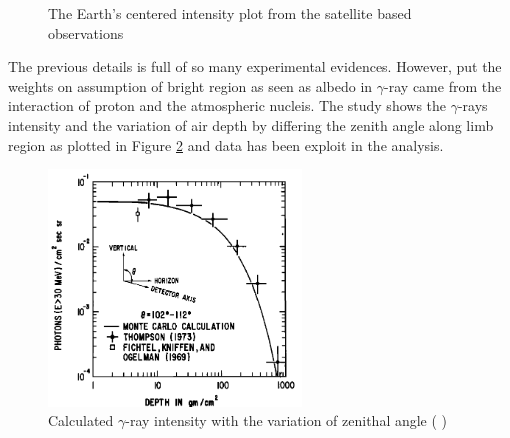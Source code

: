 \begin{figure}[h]
    \centering
        \hfill
        \caption{
            The Earth's centered intensity plot from the satellite based observations
        }
       \label{fig:gamma_earth_second_wave}
\end{figure}

The previous details is full of so many experimental evidences.
However, \cite{Morris84} put the weights on assumption of 
bright region as seen as albedo in $\gamma$-ray came from the 
interaction of proton and the atmospheric nucleis. The study
shows the $\gamma$-rays intensity and the variation of air depth 
by differing the zenith angle along limb region as plotted in 
Figure \ref{fig:emit_photon_vs_depth} and \cite{Thompson81} data 
has been exploit in the analysis.

\begin{figure}[h]
    \centering
    \includegraphics[width=0.6\textwidth]{content/literature_review/figures/morris_photon_vs_depth}
    \caption{
        Calculated $\gamma$-ray intensity with the variation of 
        zenithal angle
        (\cite{Morris84} )
    }
    \label{fig:emit_photon_vs_depth}
\end{figure}

